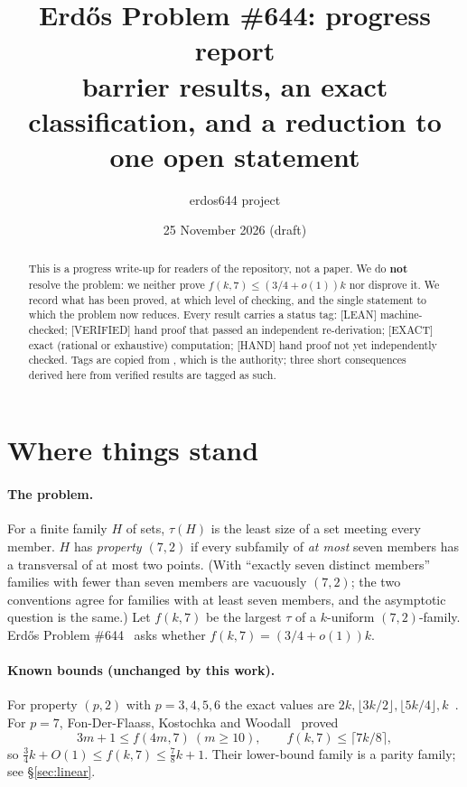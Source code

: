 \documentclass[11pt]{article}
\title{Erd\H{o}s Problem \#644: progress report\\[3pt]
\large barrier results, an exact classification, and a reduction to one open statement}
\author{erdos644 project}
\date{25 November 2026 (draft)}
\theoremstyle{definition}
\newcommand{\st}[1]{\textsf{\small[#1]}}
\newcommand{\file}[1]{\path{#1}}
\begin{document}
\maketitle

\begin{abstract}
\noindent This is a progress write-up for readers of the repository, not a paper. We do \textbf{not} resolve
the problem: we neither prove $f(k,7)\le(3/4+o(1))k$ nor disprove it. We record what has been proved, at which level of
checking, and the single statement to which the problem now reduces. Every result carries a status tag:
\st{LEAN} machine-checked; \st{VERIFIED} hand proof that passed an independent re-derivation; \st{EXACT} exact
(rational or exhaustive) computation; \st{HAND} hand proof not yet independently checked. Tags are copied from
\file{notes/LEDGER.md}, which is the authority; three short consequences derived here from verified results are
tagged as such.
\end{abstract}

\section{Where things stand}\label{sec:summary}

\paragraph{The problem.} For a finite family $H$ of sets, $\tau(H)$ is the least size of a set meeting every member.
$H$ has \emph{property $(7,2)$} if every subfamily of \emph{at most} seven members has a transversal of at most two
points. (With ``exactly seven distinct members'' families with fewer than seven members are vacuously $(7,2)$; the
two conventions agree for families with at least seven members, and the asymptotic question is the same.) Let
$f(k,7)$ be the largest $\tau$ of a $k$-uniform $(7,2)$-family. Erd\H{o}s Problem \#644~\cite{EP} asks whether
$f(k,7)=(3/4+o(1))k$.

\paragraph{Known bounds (unchanged by this work).} For property $(p,2)$ with $p=3,4,5,6$ the exact values are
$2k,\lfloor 3k/2\rfloor,\lfloor 5k/4\rfloor,k$~\cite{EFKT}. For $p=7$, Fon-Der-Flaass, Kostochka and
Woodall~\cite{FKW} proved
\[
3m+1\le f(4m,7)\ (m\ge10),\qquad f(k,7)\le\lceil 7k/8\rceil ,
\]
so $\tfrac34k+O(1)\le f(k,7)\le\tfrac78k+1$. Their lower-bound family is a parity family; see \S\ref{sec:linear}.
\end{document}
